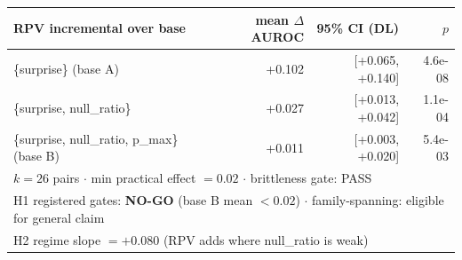 \begin{tabular}{lrrr}
\toprule
RPV incremental over base & mean $\Delta$AUROC & 95\% CI (DL) & $p$ \\
\midrule
\{surprise\} \;(base A) & +0.102 & [+0.065, +0.140] & 4.6e-08 \\
\{surprise, null\_ratio\} & +0.027 & [+0.013, +0.042] & 1.1e-04 \\
\{surprise, null\_ratio, p\_max\} \;(base B) & +0.011 & [+0.003, +0.020] & 5.4e-03 \\
\midrule
\multicolumn{4}{l}{$k=26$ pairs $\cdot$ min practical effect $=0.02$ $\cdot$ brittleness gate: PASS} \\
\multicolumn{4}{l}{H1 registered gates: \textbf{NO-GO} (base B mean $<0.02$) $\cdot$ family-spanning: eligible for general claim} \\
\multicolumn{4}{l}{H2 regime slope $=+0.080$ (RPV adds where null\_ratio is weak)} \\
\bottomrule
\end{tabular}
